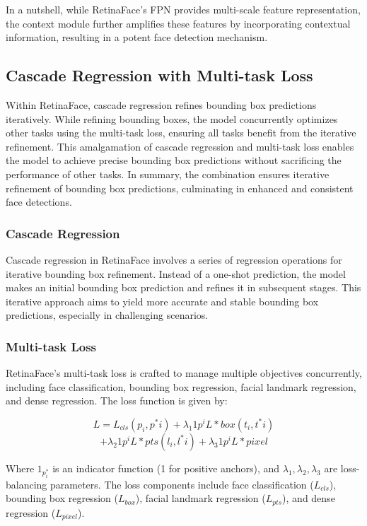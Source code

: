 \documentclass{article}
\begin{document}
In a nutshell, while RetinaFace's FPN provides multi-scale feature representation, the context module further amplifies these features by incorporating contextual information, resulting in a potent face detection mechanism.

\subsection{Cascade Regression with Multi-task Loss}

Within RetinaFace, cascade regression refines bounding box predictions iteratively. While refining bounding boxes, the model concurrently optimizes other tasks using the multi-task loss, ensuring all tasks benefit from the iterative refinement. This amalgamation of cascade regression and multi-task loss enables the model to achieve precise bounding box predictions without sacrificing the performance of other tasks. In summary, the combination ensures iterative refinement of bounding box predictions, culminating in enhanced and consistent face detections.

\subsubsection{Cascade Regression}

Cascade regression in RetinaFace involves a series of regression operations for iterative bounding box refinement. Instead of a one-shot prediction, the model makes an initial bounding box prediction and refines it in subsequent stages. This iterative approach aims to yield more accurate and stable bounding box predictions, especially in challenging scenarios.

\subsubsection{Multi-task Loss}

RetinaFace's multi-task loss is crafted to manage multiple objectives concurrently, including face classification, bounding box regression, facial landmark regression, and dense regression. The loss function is given by:

\[ L = L_{cls}(p_i, p^*i) + \lambda_1 1{p^i} L*{box}(t_i, t^*i) \]
\[+ \lambda_2 1{p^i} L*{pts}(l_i, l^*i) + \lambda_3 1{p^i} L*{pixel} \]

Where \( 1_{p^*_i} \) is an indicator function (1 for positive anchors), and \( \lambda_1, \lambda_2, \lambda_3 \) are loss-balancing parameters. The loss components include face classification (\(L_{cls}\)), bounding box regression (\(L_{box}\)), facial landmark regression (\(L_{pts}\)), and dense regression (\(L_{pixel}\)).
\end{document}
